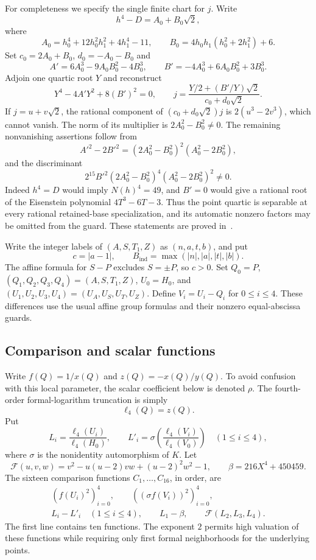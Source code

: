 \documentclass[11pt,a4paper]{article}
\begin{document}
For completeness we specify the single finite chart for $j$. Write
\[
 h^4-D=A_0+B_0\sqrt2,
\]
where
\[
 A_0=h_0^4+12h_0^2h_1^2+4h_1^4-11,\qquad
 B_0=4h_0h_1(h_0^2+2h_1^2)+6.
\]
Set $c_0=2A_0+B_0$, $d_0=-A_0-B_0$ and
\[
 A'=6A_0^3-9A_0B_0^2-4B_0^3,\qquad
 B'=-4A_0^3+6A_0B_0^2+3B_0^3.
\]
Adjoin one quartic root $Y$ and reconstruct
\begin{equation}\label{eq:quartic-chart}
 Y^4-4A'Y^2+8(B')^2=0,\qquad
 j=\frac{Y/2+(B'/Y)\sqrt2}{c_0+d_0\sqrt2}.
\end{equation}
If $j=u+v\sqrt2$, the rational component of
$(c_0+d_0\sqrt2)j$ is $2(u^3-2v^3)$, which cannot vanish.
The norm of its multiplier is $2A_0^2-B_0^2\ne0$. The remaining
nonvanishing assertions follow from
\[
 A'^2-2B'^2=(2A_0^2-B_0^2)^2(A_0^2-2B_0^2),
\]
and the discriminant
\[
 2^{15}B'^2(2A_0^2-B_0^2)^4(A_0^2-2B_0^2)^2\ne0.
\]
Indeed $h^4=D$ would imply $N(h)^4=49$, and $B'=0$ would give
a rational root of the Eisenstein polynomial $4T^3-6T-3$.
Thus the point quartic is separable at every rational retained-base
specialization, and its automatic nonzero factors may be omitted from
the guard. These statements are proved in~\cite{QuadraticCharts,SquarePredicate}.

Write the integer labels of $(A,S,T_1,Z)$ as $(n,a,t,b)$, and put
\[
 c=|a-1|,\qquad B_{\mathrm{ind}}=\max(|n|,|a|,|t|,|b|).
\]
The affine formula for $S-P$ excludes $S=\pm P$, so $c>0$. Set
$Q_0=P$, $(Q_1,Q_2,Q_3,Q_4)=(A,S,T_1,Z)$, $U_0=H_0$, and
$(U_1,U_2,U_3,U_4)=(U_A,U_S,U_T,U_Z)$. Define
$V_i=U_i-Q_i$ for $0\le i\le4$. These differences use the usual
affine group formulas and their nonzero equal-abscissa guards.

\subsection{Comparison and scalar functions}

Write $f(Q)=1/x(Q)$ and $z(Q)=-x(Q)/y(Q)$. To avoid confusion
with this local parameter, the scalar coefficient below is denoted
$\rho$. The fourth-order formal-logarithm truncation is simply
\[
                           \ell_4(Q)=z(Q).
\]
Put
\[
 L_i=\frac{\ell_4(U_i)}{\ell_4(H_0)},\qquad
 L'_i=\sigma\left(\frac{\ell_4(V_i)}{\ell_4(V_0)}\right)
 \quad(1\le i\le4),
\]
where $\sigma$ is the nonidentity automorphism of $K$. Let
\[
 \mathcal F(u,v,w)=v^2-u(u-2)vw+(u-2)^2w^2-1,
 \qquad \beta=216X^4+450459.
\]
The sixteen comparison functions $C_1,\ldots,C_{16}$, in order,
are
\begin{equation}\label{eq:comparison-list}
 \begin{gathered}
 (f(U_i)^2)_{i=0}^4,\qquad
 ((\sigma f(V_i))^2)_{i=0}^4,\\
 L_i-L'_i\quad(1\le i\le4),\qquad
 L_1-\beta,\qquad \mathcal F(L_2,L_3,L_4).
 \end{gathered}
\end{equation}
The first line contains ten functions. The exponent $2$ permits
high valuation of these functions while requiring only first formal
neighborhoods for the underlying points.
\end{document}
